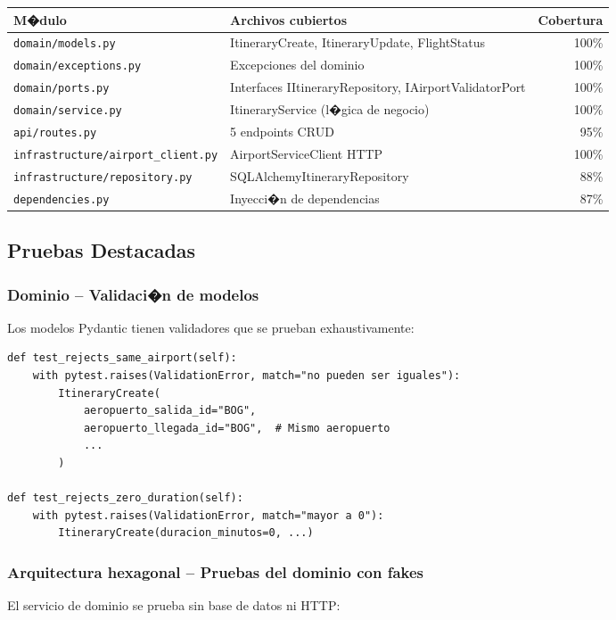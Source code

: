 \documentclass[12pt,a4paper]{article}
\begin{document}
\begin{tabularx}{\textwidth}{lXr}
  \toprule
  \textbf{M�dulo} & \textbf{Archivos cubiertos} & \textbf{Cobertura} \\
  \midrule
  \texttt{domain/models.py} & ItineraryCreate, ItineraryUpdate, FlightStatus & 100\% \\
  \texttt{domain/exceptions.py} & Excepciones del dominio & 100\% \\
  \texttt{domain/ports.py} & Interfaces IItineraryRepository, IAirportValidatorPort & 100\% \\
  \texttt{domain/service.py} & ItineraryService (l�gica de negocio) & 100\% \\
  \texttt{api/routes.py} & 5 endpoints CRUD & 95\% \\
  \texttt{infrastructure/airport\_client.py} & AirportServiceClient HTTP & 100\% \\
  \texttt{infrastructure/repository.py} & SQLAlchemyItineraryRepository & 88\% \\
  \texttt{dependencies.py} & Inyecci�n de dependencias & 87\% \\
  \bottomrule
\end{tabularx}

\subsection{Pruebas Destacadas}

\subsubsection{Dominio -- Validaci�n de modelos}
Los modelos Pydantic tienen validadores que se prueban exhaustivamente:

\vspace{0.3cm}
\begin{lstlisting}[style=pythonstyle]
def test_rejects_same_airport(self):
    with pytest.raises(ValidationError, match="no pueden ser iguales"):
        ItineraryCreate(
            aeropuerto_salida_id="BOG",
            aeropuerto_llegada_id="BOG",  # Mismo aeropuerto
            ...
        )

def test_rejects_zero_duration(self):
    with pytest.raises(ValidationError, match="mayor a 0"):
        ItineraryCreate(duracion_minutos=0, ...)
\end{lstlisting}

\subsubsection{Arquitectura hexagonal -- Pruebas del dominio con fakes}
El servicio de dominio se prueba sin base de datos ni HTTP:
\end{document}
